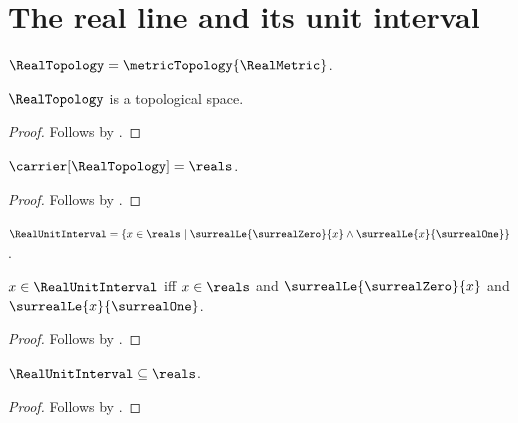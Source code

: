 \section{The real line and its unit interval}





\begin{definition}\label{real_topology}
    $\RealTopology=\metricTopology{\RealMetric}$.
\end{definition}

\begin{classification}\label{real_topology_is_topological_space}
    $\RealTopology$ is a topological space.
\end{classification}
\begin{proof}
    Follows by
        .
\end{proof}

\begin{proposition}\label{real_topology_carrier}
    $\carrier[\RealTopology]=\reals$.
\end{proposition}
\begin{proof}
    Follows by
        .
\end{proof}

\begin{definition}\label{real_unit_interval}
    $\RealUnitInterval=
        \{x\in\reals\mid
            \surrealLe{\surrealZero}{x}\land
            \surrealLe{x}{\surrealOne}\}$.
\end{definition}

\begin{proposition}\label{real_unit_interval_iff}
    $x\in\RealUnitInterval$ iff
        $x\in\reals$ and
        $\surrealLe{\surrealZero}{x}$ and
        $\surrealLe{x}{\surrealOne}$.
\end{proposition}
\begin{proof}
    Follows by .
\end{proof}

\begin{proposition}\label{real_unit_interval_subset_reals}
    $\RealUnitInterval\subseteq\reals$.
\end{proposition}
\begin{proof}
    Follows by .
\end{proof}

